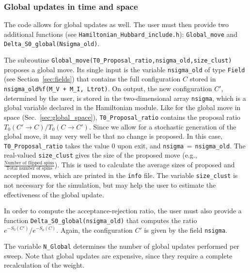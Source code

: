 \subsubsection{Global updates in time and space}
\label{sec:global_slice}
%  
The code allows for global updates as well. The user must then provide two additional functions (see \texttt{Hamiltonian\_Hubbard\_include.h}): \texttt{Global\_move} and \texttt{Delta\_\-S0\_\-global(Nsigma\_old)}.   

The subroutine  \texttt{Global\_move(T0\_Proposal\_ratio,nsigma\_old,size\_clust)}  proposes  a global move. 
Its single input is the variable \texttt{nsigma\_old} of type \texttt{Field} (see Section~\ref{sec:fields}) that contains  the full  configuration $C$ stored in \texttt{nsigma\_old\%f(M\_V + M\_I, Ltrot)}.  On output, the new configuration $C'$, determined by the user,  is stored in the two-dimensional array \texttt{nsigma}, which is a global variable declared in the Hamiltonian module.
Like for the global move in space (Sec.~\ref{sec:global_space}), \texttt{T0\_Proposal\_ratio} contains the proposal ratio $T_0(C' \rightarrow C) / T_0(C \rightarrow C') $.
Since we allow for a stochastic  generation of  the global move, it may very well be that no change is proposed. In this case, \texttt{T0\_Proposal\_ratio}   takes the value 0 upon exit, and  \texttt{nsigma$\,=\,$nsigma\_old}.   
The real-valued \texttt{size\_clust} gives the size of the proposed move (e.g., $\tfrac{\text{Number of flipped spins}}{\text{Total number of spins}}$). This is used to calculate the average sizes of proposed and accepted moves, which are printed in the \texttt{info} file. The variable \texttt{size\_clust} is not necessary for the simulation, but may help the user to estimate the effectiveness of the global update.

In order to compute the acceptance-rejection ratio,  the user must also provide a function \linebreak
\texttt{Delta\_\-S0\_\-global(nsigma\_old)} that computes the ratio $e^{-S_0(C')}/e^{-S_0(C)}$. Again, the configuration $C'$ is given by the field \texttt{nsigma}.

The variable \texttt{N\_Global} determines the number of global updates performed per sweep. Note that global updates are expensive, since they require a complete recalculation of the weight.
% 

